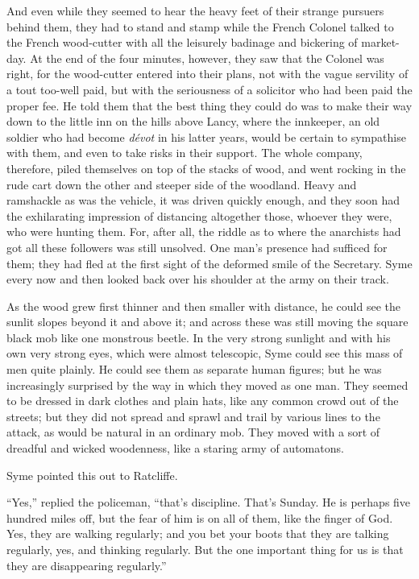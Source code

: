 \documentclass{book}
\begin{document}
And even while they seemed to hear the heavy feet of their strange pursuers behind them, they had to stand and stamp while the French Colonel talked to the French wood-cutter with all the leisurely badinage and bickering of market-day. At the end of the four minutes, however, they saw that the Colonel was right, for the wood-cutter entered into their plans, not with the vague servility of a tout too-well paid, but with the seriousness of a solicitor who had been paid the proper fee. He told them that the best thing they could do was to make their way down to the little inn on the hills above Lancy, where the innkeeper, an old soldier who had become \emph{dévot} in his latter years, would be certain to sympathise with them, and even to take risks in their support. The whole company, therefore, piled themselves on top of the stacks of wood, and went rocking in the rude cart down the other and steeper side of the woodland. Heavy and ramshackle as was the vehicle, it was driven quickly enough, and they soon had the exhilarating impression of distancing altogether those, whoever they were, who were hunting them. For, after all, the riddle as to where the anarchists had got all these followers was still unsolved. One man’s presence had sufficed for them; they had fled at the first sight of the deformed smile of the Secretary. Syme every now and then looked back over his shoulder at the army on their track.

As the wood grew first thinner and then smaller with distance, he could see the sunlit slopes beyond it and above it; and across these was still moving the square black mob like one monstrous beetle. In the very strong sunlight and with his own very strong eyes, which were almost telescopic, Syme could see this mass of men quite plainly. He could see them as separate human figures; but he was increasingly surprised by the way in which they moved as one man. They seemed to be dressed in dark clothes and plain hats, like any common crowd out of the streets; but they did not spread and sprawl and trail by various lines to the attack, as would be natural in an ordinary mob. They moved with a sort of dreadful and wicked woodenness, like a staring army of automatons.

Syme pointed this out to Ratcliffe.

“Yes,” replied the policeman, “that’s discipline. That’s Sunday. He is perhaps five hundred miles off, but the fear of him is on all of them, like the finger of God. Yes, they are walking regularly; and you bet your boots that they are talking regularly, yes, and thinking regularly. But the one important thing for us is that they are disappearing regularly.”
\end{document}
